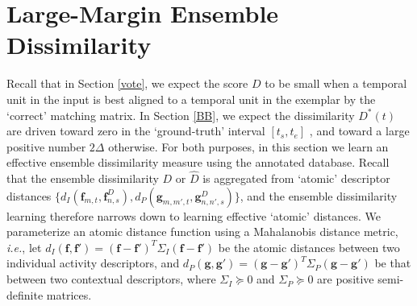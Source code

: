 \section{Large-Margin Ensemble Dissimilarity}
\label{MetLearn}


Recall that in Section \ref{vote}, we expect the score $D$ to be small when a temporal unit in the input is best aligned to a temporal unit in the exemplar by the `correct' matching matrix. In Section \ref{BB}, we expect the dissimilarity $D^{*}(t)$ are driven toward zero in the `ground-truth' interval $[t_{s}, t_{e}]$ , and toward a large positive number $2\Delta$ otherwise. For both purposes, in this section we learn an effective ensemble dissimilarity measure using the annotated database. Recall that the ensemble dissimilarity $D$ or $\hat{D}$ is aggregated from `atomic' descriptor distances $\{ d_{I}(\mathbf{f}_{m,t}, \mathbf{f}^{D}_{n,s}), d_{P}(\mathbf{g}_{m,m',t}, \mathbf{g}^{D}_{n,n',s})\}$, and the ensemble dissimilarity learning therefore narrows down to learning effective `atomic'  distances.  We parameterize an atomic distance function using a Mahalanobis distance metric, \textit{i.e.}, let $d_{I}(\mathbf{f}, \mathbf{f}')=(\mathbf{f}-\mathbf{f}')^{T}\Sigma_{I}(\mathbf{f}-\mathbf{f}')$ be the atomic distances between two individual activity descriptors, and $d_{P}(\mathbf{g}, \mathbf{g}')=(\mathbf{g}-\mathbf{g}')^{T}\Sigma_{P}(\mathbf{g}-\mathbf{g}')$ be that between two contextual descriptors, where $\Sigma_{I}\succeq 0$ and $\Sigma_{P}\succeq 0$  are positive semi-definite matrices.  


